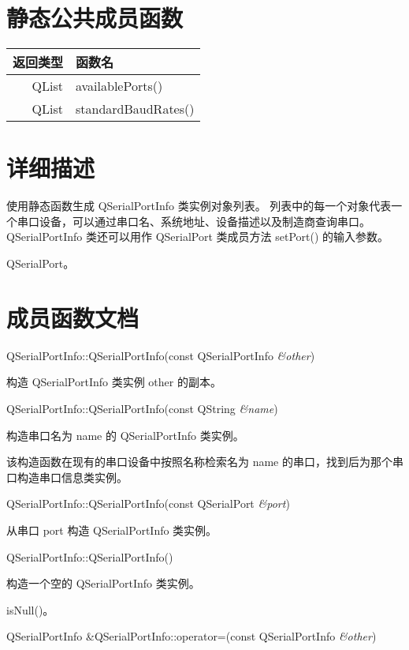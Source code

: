 \section{静态公共成员函数}

\begin{tabular}{|r|l|}
\hline
返回类型 	&函数名 \\ 
\hline
QList &	availablePorts() \\ 
\hline
QList &	standardBaudRates() \\ 
\hline
\end{tabular}

\section{详细描述}

使用静态函数生成 QSerialPortInfo 类实例对象列表。
列表中的每一个对象代表一个串口设备，可以通过串口名、系统地址、设备描述以及制造商查询串口。 
QSerialPortInfo 类还可以用作 QSerialPort 类成员方法 setPort() 的输入参数。

\begin{seeAlso}
QSerialPort。
\end{seeAlso}


\section{成员函数文档}

QSerialPortInfo::QSerialPortInfo(const QSerialPortInfo \emph{\&other})

构造 QSerialPortInfo 类实例 other 的副本。

QSerialPortInfo::QSerialPortInfo(const QString \emph{\&name})

构造串口名为 name 的 QSerialPortInfo 类实例。

该构造函数在现有的串口设备中按照名称检索名为 name 的串口，找到后为那个串口构造串口信息类实例。

QSerialPortInfo::QSerialPortInfo(const QSerialPort \emph{\&port})

从串口 port 构造 QSerialPortInfo 类实例。

QSerialPortInfo::QSerialPortInfo()

构造一个空的 QSerialPortInfo 类实例。

\begin{seeAlso}
isNull()。
\end{seeAlso}

QSerialPortInfo \&QSerialPortInfo::operator=(const QSerialPortInfo \emph{\&other})

